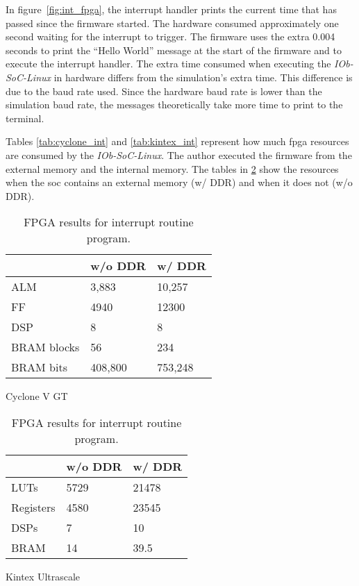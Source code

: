 In figure~\ref{fig:int_fpga}, the interrupt handler prints the current time that has passed since the firmware started. The hardware consumed approximately one second waiting for the interrupt to trigger. The firmware uses the extra 0.004 seconds to print the \enquote{Hello World} message at the start of the firmware and to execute the interrupt handler. The extra time consumed when executing the \textit{IOb-SoC-Linux} in hardware differs from the simulation's extra time. This difference is due to the baud rate used. Since the hardware baud rate is lower than the simulation baud rate, the messages theoretically take more time to print to the terminal.

Tables \ref{tab:cyclone_int} and \ref{tab:kintex_int} represent how much \acrshort{fpga} resources are consumed by the \textit{IOb-SoC-Linux}. The author executed the firmware from the external memory and the internal memory. The tables in \ref{tab:fpga_int} show the resources when the \acrshort{soc} contains an external memory (w/ DDR) and when it does not (w/o DDR).

\begin{table}[!ht]
    \begin{subtable}[h]{0.45\textwidth}
        \centering
        \begin{tabular}{l|l|l|}
            \cline{2-3}
                                              & w/o DDR & w/ DDR  \\ \hline
            \multicolumn{1}{|l|}{ALM}         & 3,883   & 10,257  \\ \hline
            \multicolumn{1}{|l|}{FF}          & 4940    & 12300   \\ \hline
            \multicolumn{1}{|l|}{DSP}         & 8       & 8       \\ \hline
            \multicolumn{1}{|l|}{BRAM blocks} & 56      & 234     \\ \hline
            \multicolumn{1}{|l|}{BRAM bits}   & 408,800 & 753,248 \\ \hline
        \end{tabular}
       \caption{Cyclone V GT}
       \label{tab:cyclone_int}
    \end{subtable}
    \hfill
    \begin{subtable}[h]{0.45\textwidth}
        \centering
        \begin{tabular}{l|l|l|}
            \cline{2-3}
                                            & w/o DDR & w/ DDR \\ \hline
            \multicolumn{1}{|l|}{LUTs}      & 5729    & 21478  \\ \hline
            \multicolumn{1}{|l|}{Registers} & 4580    & 23545  \\ \hline
            \multicolumn{1}{|l|}{DSPs}      & 7       & 10     \\ \hline
            \multicolumn{1}{|l|}{BRAM}      & 14      & 39.5   \\ \hline
        \end{tabular}
        \caption{Kintex Ultrascale}
        \label{tab:kintex_int}
     \end{subtable}
     \caption{FPGA results for interrupt routine program.}
     \label{tab:fpga_int}
\end{table}

